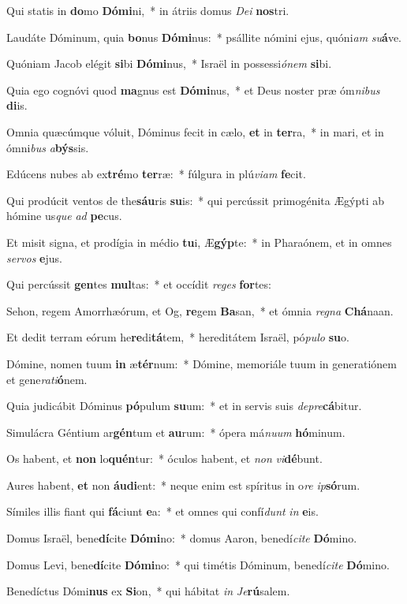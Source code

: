 \item Qui statis in \textbf{do}mo \textbf{Dó}\textbf{mi}ni,~* in átriis domus \textit{De}\textit{i} \textbf{nos}tri.
\item Laudáte Dóminum, quia \textbf{bo}nus \textbf{Dó}\textbf{mi}nus:~* psállite nómini ejus, quóni\textit{am} \textit{su}\textbf{á}ve.
\item Quóniam Jacob elégit \textbf{si}bi \textbf{Dó}\textbf{mi}nus,~* Israël in possessi\textit{ó}\textit{nem} \textbf{si}bi.
\item Quia ego cognóvi quod \textbf{ma}gnus est \textbf{Dó}\textbf{mi}nus,~* et Deus noster præ óm\textit{ni}\textit{bus} \textbf{di}is.
\item Omnia quæcúmque vóluit, Dóminus fecit in cælo, \textbf{et} in \textbf{ter}ra,~* in mari, et in ómni\textit{bus} \textit{a}\textbf{býs}sis.
\item Edúcens nubes ab ex\textbf{tré}mo \textbf{ter}ræ:~* fúlgura in plú\textit{vi}\textit{am} \textbf{fe}cit.
\item Qui prodúcit ventos de the\textbf{sáu}ris \textbf{su}is:~* qui percússit primogénita Ægýpti ab hómine us\textit{que} \textit{ad} \textbf{pe}cus.
\item Et misit signa, et prodígia in médio \textbf{tu}i, Æ\textbf{gýp}te:~* in Pharaónem, et in omnes \textit{ser}\textit{vos} \textbf{e}jus.
\item Qui percússit \textbf{gen}tes \textbf{mul}tas:~* et occídit \textit{re}\textit{ges} \textbf{for}tes:
\item Sehon, regem Amorrhæórum, et Og, \textbf{re}gem \textbf{Ba}san,~* et ómnia \textit{re}\textit{gna} \textbf{Chá}naan.
\item Et dedit terram eórum he\textbf{re}di\textbf{tá}tem,~* hereditátem Israël, pó\textit{pu}\textit{lo} \textbf{su}o.
\item Dómine, nomen tuum \textbf{in} æ\textbf{tér}num:~* Dómine, memoriále tuum in generatiónem et gene\textit{ra}\textit{ti}\textbf{ó}nem.
\item Quia judicábit Dóminus \textbf{pó}pulum \textbf{su}um:~* et in servis suis \textit{de}\textit{pre}\textbf{cá}bitur.
\item Simulácra Géntium ar\textbf{gén}tum et \textbf{au}rum:~* ópera má\textit{nu}\textit{um} \textbf{hó}minum.
\item Os habent, et \textbf{non} lo\textbf{quén}tur:~* óculos habent, et \textit{non} \textit{vi}\textbf{dé}bunt.
\item Aures habent, \textbf{et} non \textbf{áu}\textbf{di}ent:~* neque enim est spíritus in o\textit{re} \textit{ip}\textbf{só}rum.
\item Símiles illis fiant qui \textbf{fá}ciunt \textbf{e}a:~* et omnes qui confí\textit{dunt} \textit{in} \textbf{e}is.
\item Domus Israël, bene\textbf{dí}cite \textbf{Dó}\textbf{mi}no:~* domus Aaron, benedí\textit{ci}\textit{te} \textbf{Dó}mino.
\item Domus Levi, bene\textbf{dí}cite \textbf{Dó}\textbf{mi}no:~* qui timétis Dóminum, benedí\textit{ci}\textit{te} \textbf{Dó}mino.
\item Benedíctus Dómi\textbf{nus} ex \textbf{Si}on,~* qui hábitat \textit{in} \textit{Je}\textbf{rú}salem.
